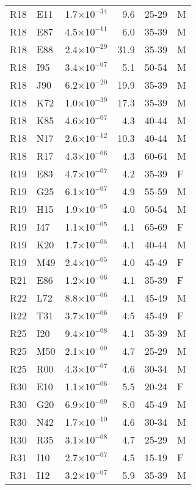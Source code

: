 \begin{longtable}{lllrll}
   R18 & E11 & 1.7$\times10^{-34}$ & 9.6 & 25-29 & M \\ 
   R18 & E87 & 4.5$\times10^{-11}$ & 6.0 & 35-39 & M \\ 
   R18 & E88 & 2.4$\times10^{-29}$ & 31.9 & 35-39 & M \\ 
   R18 & I95 & 3.4$\times10^{-07}$ & 5.1 & 50-54 & M \\ 
   R18 & J90 & 6.2$\times10^{-20}$ & 19.9 & 35-39 & M \\ 
   R18 & K72 & 1.0$\times10^{-39}$ & 17.3 & 35-39 & M \\ 
   R18 & K85 & 4.6$\times10^{-07}$ & 4.3 & 40-44 & M \\ 
   R18 & N17 & 2.6$\times10^{-12}$ & 10.3 & 40-44 & M \\ 
   R18 & R17 & 4.3$\times10^{-06}$ & 4.3 & 60-64 & M \\ 
   R19 & E83 & 4.7$\times10^{-07}$ & 4.2 & 35-39 & F \\ 
   R19 & G25 & 6.1$\times10^{-07}$ & 4.9 & 55-59 & M \\ 
   R19 & H15 & 1.9$\times10^{-05}$ & 4.0 & 50-54 & M \\ 
   R19 & I47 & 1.1$\times10^{-05}$ & 4.1 & 65-69 & F \\ 
   R19 & K20 & 1.7$\times10^{-05}$ & 4.1 & 40-44 & M \\ 
   R19 & M49 & 2.4$\times10^{-05}$ & 4.0 & 45-49 & F \\ 
   R21 & E86 & 1.2$\times10^{-06}$ & 4.1 & 35-39 & F \\ 
   R22 & L72 & 8.8$\times10^{-06}$ & 4.1 & 45-49 & M \\ 
   R22 & T31 & 3.7$\times10^{-06}$ & 4.5 & 45-49 & F \\ 
   R25 & I20 & 9.4$\times10^{-08}$ & 4.1 & 35-39 & M \\ 
   R25 & M50 & 2.1$\times10^{-09}$ & 4.7 & 25-29 & M \\ 
   R25 & R00 & 4.3$\times10^{-07}$ & 4.6 & 30-34 & M \\ 
   R30 & E10 & 1.1$\times10^{-06}$ & 5.5 & 20-24 & F \\ 
   R30 & G20 & 6.9$\times10^{-09}$ & 8.0 & 45-49 & M \\ 
   R30 & N42 & 1.7$\times10^{-10}$ & 4.6 & 30-34 & M \\ 
   R30 & R35 & 3.1$\times10^{-08}$ & 4.7 & 25-29 & M \\ 
   R31 & I10 & 2.7$\times10^{-07}$ & 4.5 & 15-19 & F \\ 
   R31 & I12 & 3.2$\times10^{-07}$ & 5.9 & 35-39 & M \\ 

\end{longtable}
